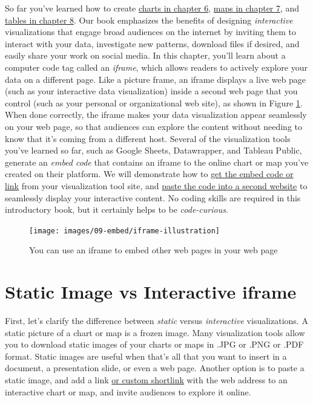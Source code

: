 \documentclass[
  english,
]{book}
\begin{document}
So far you've learned how to create \href{chart.html}{charts in chapter 6}, \href{map.html}{maps in chapter 7}, and \href{table.html}{tables in chapter 8}. Our book emphasizes the benefits of designing \emph{interactive} visualizations that engage broad audiences on the internet by inviting them to interact with your data, investigate new patterns, download files if desired, and easily share your work on social media. In this chapter, you'll learn about a computer code tag called an \emph{iframe}, which allows readers to actively explore your data on a different page. Like a picture frame, an iframe displays a live web page (such as your interactive data visualization) inside a second web page that you control (such as your personal or organizational web site), as shown in Figure \ref{fig:iframe-illustration}. When done correctly, the iframe makes your data visualization appear seamlessly on your web page, so that audiences can explore the content without needing to know that it's coming from a different host. Several of the visualization tools you've learned so far, such as Google Sheets, Datawrapper, and Tableau Public, generate an \emph{embed code} that contains an iframe to the online chart or map you've created on their platform. We will demonstrate how to \href{embed-code.html}{get the embed code or link} from your visualization tool site, and \href{paste-code.html}{paste the code into a second website} to seamlessly display your interactive content. No coding skills are required in this introductory book, but it certainly helps to be \emph{code-curious}.



\begin{figure}
\texttt{[image: images/09-embed/iframe-illustration]} \caption{You can use an iframe to embed other web pages in your web page}\label{fig:iframe-illustration}
\end{figure}

\hypertarget{static}{%
\section*{Static Image vs Interactive iframe}\label{static}}

First, let's clarify the difference between \emph{static} versus \emph{interactive} visualizations. A static picture of a chart or map is a frozen image. Many visualization tools allow you to download static images of your charts or maps in .JPG or .PNG or .PDF format. Static images are useful when that's all that you want to insert in a document, a presentation slide, or even a web page. Another option is to paste a static image, and add a link \href{share.html}{or custom shortlink} with the web address to an interactive chart or map, and invite audiences to explore it online.
\end{document}
